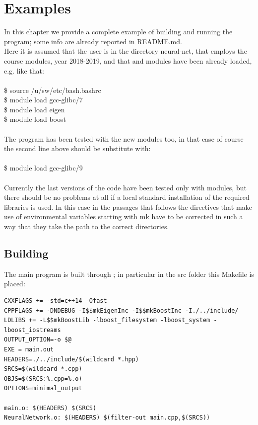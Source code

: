 \documentclass[12pt, a4paper]{report}
\theoremstyle{definition}
\begin{document}
{\chapter{Examples}\label{chapter4}
\setcounter{figure}{11}
In this chapter we provide a complete example of building and running the program; some info are already reported in README.md.\\
Here it is assumed that the user is in the directory neural-net, that employs the \cite{pacs} course modules, year 2018-2019, and that \cite{eigen} and \cite{boost} modules have been already loaded, e.g. like that:\\
{\\ \ttfamily 
	\$ source /u/sw/etc/bash.bashrc\\
	\$ module load gcc-glibc/7\\
	\$ module load eigen\\
	\$ module load boost\\
	\\}
The program has been tested with the new modules too, in that case of course the second line above should be substitute with:\\
{\\ \ttfamily 
	\$ module load gcc-glibc/9\\
	\\}
Currently the last versions of the code have been tested only with modules, but there should be no problems at all if a local standard installation of the required libraries is used. In this case in the passages that follows the directives that make use of environmental variables starting with {\ttfamily mk} have to be corrected in such a way that they take the path to the correct directories.
\newpage
\section{Building}
The main program is built through \cite{make}; in particular in the src folder this Makefile is placed:
\begin{lstlisting}[frame=single]
CXXFLAGS += -std=c++14 -Ofast
CPPFLAGS += -DNDEBUG -I$$mkEigenInc -I$$mkBoostInc -I./../include/
LDLIBS += -L$$mkBoostLib -lboost_filesystem -lboost_system -lboost_iostreams
OUTPUT_OPTION=-o $@
EXE = main.out
HEADERS=./../include/$(wildcard *.hpp)
SRCS=$(wildcard *.cpp)
OBJS=$(SRCS:%.cpp=%.o)
OPTIONS=minimal_output

main.o: $(HEADERS) $(SRCS)
NeuralNetwork.o: $(HEADERS) $(filter-out main.cpp,$(SRCS))


\end{lstlisting}}
\end{document}
